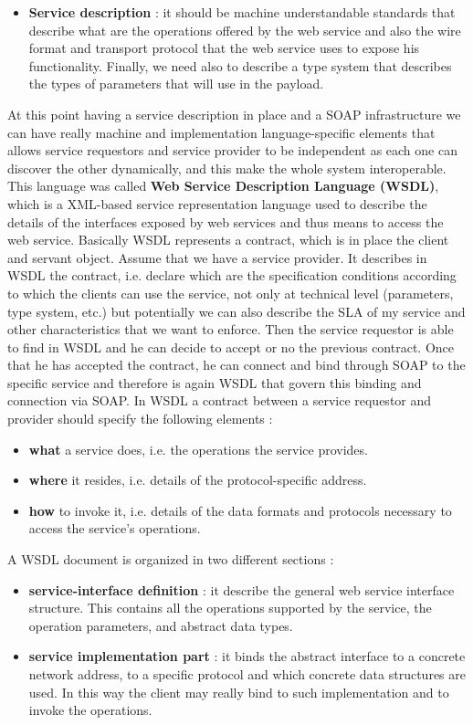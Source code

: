 \documentclass[11pt]{article}
\begin{document}
\begin{itemize}
\item \textbf{Service description} : it should be machine understandable standards that describe what are the operations offered by the web service and also the wire format and transport protocol that the web service uses to expose his functionality. Finally, we need also to describe a type system that describes the types of parameters that will use in the payload.
\end{itemize}
At this point having a service description in place and a SOAP infrastructure we can have really machine and implementation language-specific elements that allows service requestors and service provider to be independent as each one can discover the other dynamically, and this make the whole system interoperable. This language was called \textbf{Web Service Description Language (WSDL)}, which is a XML-based service representation language used to describe the details of the interfaces exposed by web services and thus means to access the web service. Basically WSDL represents a contract, which is in place the client and servant object. Assume that we have a service provider. It describes in WSDL the contract, i.e. declare which are the specification conditions according to which the clients can use the service, not only at technical level (parameters, type system, etc.) but potentially we can also describe the SLA of my service and other characteristics that we want to enforce. Then the service requestor is able to find in WSDL and he can decide to accept or no the previous contract. Once that he has accepted the contract, he can connect and bind through SOAP to the specific service and therefore is again WSDL that govern this binding and connection via SOAP. In WSDL a contract between a service requestor and provider should specify the following elements :
\begin{itemize}
\item \textbf{what} a service does, i.e. the operations the service provides.
\item \textbf{where} it resides, i.e. details of the protocol-specific address.
\item \textbf{how} to invoke it, i.e. details of the data formats and protocols necessary to access the service's operations.
\end{itemize}
A WSDL document is organized in two different sections :
\begin{itemize}
\item \textbf{service-interface definition} : it describe the general web service interface structure. This contains all the operations supported by the service, the operation parameters, and abstract data types.
\item \textbf{service implementation part} : it binds the abstract interface to a concrete network address, to a specific protocol and which concrete data structures are used. In this way the client may really bind to such implementation and to invoke the operations.
\end{itemize}
\end{document}
